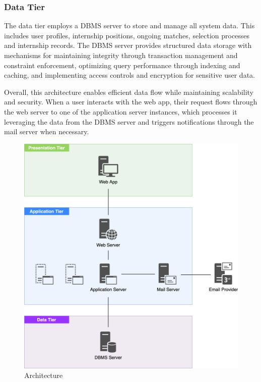 \subsubsection{Data Tier}
The data tier employs a DBMS server to store and manage all system data.
This includes user profiles, internship positions, ongoing matches, selection processes and internship records.
The DBMS server provides structured data storage with mechanisms for maintaining integrity through transaction management and constraint enforcement, optimizing query performance through indexing and caching, and implementing access controls and encryption for sensitive user data.

Overall, this architecture enables efficient data flow while maintaining scalability and security.
When a user interacts with the web app, their request flows through the web server to one of the application server instances, which processes it leveraging the data from the DBMS server and triggers notifications through the mail server when necessary.

\begin{figure}[h]
    \centering
    \includegraphics[width=14cm]{images/architecture.png}
    \caption{Architecture}
\end{figure}

